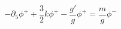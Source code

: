 \begin{equation}
-\partial_5\phi^++\frac{3}{2}k \phi^+ -\frac{g'}{g}\phi^+=\frac{m}{g}\phi^-
\end{equation}


